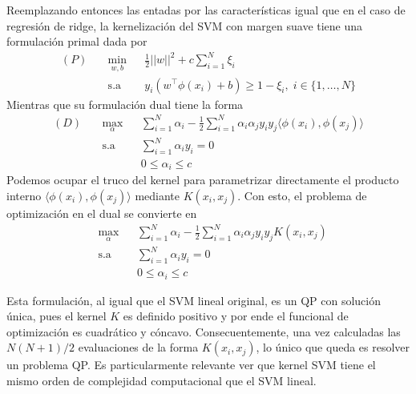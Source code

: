 Reemplazando entonces las entadas por las características igual que en el caso de regresión de ridge, la kernelización del SVM con margen suave tiene una formulación primal dada por
\begin{equation}
\begin{aligned}
(P)\quad & \underset{w,b}{\text{min}}
& & \frac{1}{2}||w||^2 + c\sum\limits_{i=1}^{N} \xi_i\\
& \text{s.a}
& & y_i (w^\top \phi(x_i) +b) \geq 1- \xi_i, \; i \in\{ 1, \ldots, N\}
\end{aligned}
\end{equation}
Mientras que su formulación dual tiene la forma
\begin{equation}
\begin{aligned}
(D)\quad & \underset{\alpha}{\text{max}}
& & \sum\limits_{i=1}^{N}\alpha_i - \frac{1}{2} \sum\limits_{i=1}^{N} \alpha_i \alpha_j y_i y_j \langle\phi(x_i), \phi(x_j)\rangle\\
& \text{s.a}
& & \sum\limits_{i=1}^{N} \alpha_i y_i= 0 \\
& &  &0 \leq \alpha_i \leq c
\end{aligned}
\end{equation}
Podemos ocupar el truco del kernel para parametrizar directamente el producto interno $\langle \phi(x_i), \phi(x_j)\rangle$ mediante $K(x_i,x_j)$. Con esto, el problema de optimización en el dual se convierte en 
\begin{equation}
\begin{aligned}
& \underset{\alpha}{\text{max}}
& & \sum\limits_{i=1}^{N}\alpha_i - \frac{1}{2} \sum\limits_{i=1}^{N} \alpha_i \alpha_j y_i y_j K(x_i, x_j)\\
& \text{s.a}
& & \sum\limits_{i=1}^{N} \alpha_i y_i= 0 \\
& &  &0 \leq \alpha_i \leq c
\end{aligned}
\end{equation}

\begin{remark}
Esta formulación, al igual que el SVM lineal original, es un QP  con solución única, pues  el kernel $K$ es definido positivo y por ende el funcional de optimización es cuadrático y cóncavo. Consecuentemente, una vez calculadas las $N(N+1)/2$ evaluaciones de la forma $K(x_i, x_j)$, lo único que queda es resolver un problema QP.  Es particularmente relevante ver que kernel SVM tiene el mismo orden de complejidad computacional que el SVM lineal.
\end{remark}

